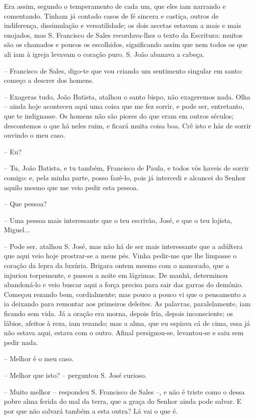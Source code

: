 Era assim, segundo o temperamento de cada um, que eles iam narrando e
comentando. Tinham já contado casos de fé sincera e castiça, outros de
indiferença, dissimulação e versatilidade; os dois ascetas estavam a
mais e mais enojados, mas S. Francisco de Sales recordava-lhes o texto
da Escritura: muitos são os chamados e poucos os escolhidos,
significando assim que nem todos os que ali iam à igreja levavam o
coração puro. S. João abanava a cabeça.

-- Francisco de Sales, digo-te que vou criando um sentimento singular em
santo: começo a descrer dos homens.

-- Exageras tudo, João Batista, atalhou o santo bispo, não exageremos
nada. Olha -- ainda hoje aconteceu aqui uma coisa que me fez sorrir, e
pode ser, entretanto, que te indignasse. Os homens não são piores do que
eram em outros séculos; descontemos o que há neles ruim, e ficará muita
coisa boa. Crê isto e hás de sorrir ouvindo o meu caso.

-- Eu?

-- Tu, João Batista, e tu também, Francisco de Paula, e todos vós haveis
de sorrir comigo: e, pela minha parte, posso fazê-lo, pois já intercedi
e alcancei do Senhor aquilo mesmo que me veio pedir esta pessoa.

-- Que pessoa?

-- Uma pessoa mais interessante que o teu escrivão, José, e que o teu
lojista, Miguel...

-- Pode ser, atalhou S. José, mas não há de ser mais interessante que a
adúltera que aqui veio hoje prostrar-se a meus pés. Vinha pedir-me que
lhe limpasse o coração da lepra da luxúria. Brigara ontem mesmo com o
namorado, que a injuriou torpemente, e passou a noite em lágrimas. De
manhã, determinou abandoná-lo e veio buscar aqui a força precisa para
sair das garras do demônio. Começou rezando bem, cordialmente; mas pouco
a pouco vi que o pensamento a ia deixando para remontar aos primeiros
deleites. As palavras, paralelamente, iam ficando sem vida. Já a oração
era morna, depois fria, depois inconsciente; os lábios, afeitos à reza,
iam rezando; mas a alma, que eu espiava cá de cima, essa já não estava
aqui, estava com o outro. Afinal persignou-se, levantou-se e saiu sem
pedir nada.

-- Melhor é o meu caso.

-- Melhor que isto? -- perguntou S. José curioso.

-- Muito melhor -- respondeu S. Francisco de Sales --, e não é triste
como o dessa pobre alma ferida do mal da terra, que a graça do Senhor
ainda pode salvar. E por que não salvará também a esta outra? Lá vai o
que é.


